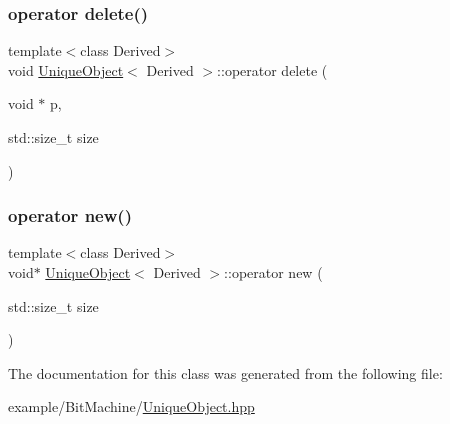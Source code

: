 \subsubsection{\texorpdfstring{operator delete()}{operator delete()}}
{\footnotesize\ttfamily template$<$class Derived$>$ \\
void \mbox{\hyperlink{class_unique_object}{Unique\+Object}}$<$ Derived $>$\+::operator delete (\begin{DoxyParamCaption}\item[{void $\ast$}]{p,  }\item[{std\+::size\+\_\+t}]{size }\end{DoxyParamCaption})\hspace{0.3cm}{\ttfamily [inline]}}

\mbox{\label{class_unique_object_acc458556cb9e67a6496d3d2c363202e6}} 
\subsubsection{\texorpdfstring{operator new()}{operator new()}}
{\footnotesize\ttfamily template$<$class Derived$>$ \\
void$\ast$ \mbox{\hyperlink{class_unique_object}{Unique\+Object}}$<$ Derived $>$\+::operator new (\begin{DoxyParamCaption}\item[{std\+::size\+\_\+t}]{size }\end{DoxyParamCaption})\hspace{0.3cm}{\ttfamily [inline]}}



The documentation for this class was generated from the following file\+:\begin{DoxyCompactItemize}
\item 
example/\+Bit\+Machine/\mbox{\hyperlink{_unique_object_8hpp}{Unique\+Object.\+hpp}}\end{DoxyCompactItemize}
